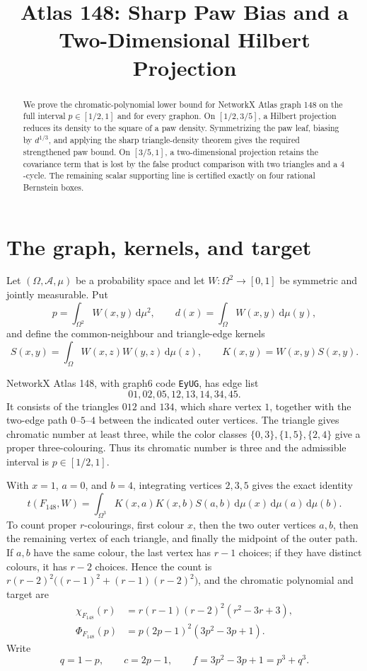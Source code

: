 \documentclass[11pt]{article}
\title{Atlas 148: Sharp Paw Bias and a Two-Dimensional Hilbert Projection}
\author{}
\date{}
\newcommand{\dd}{\,\mathrm d}
\begin{document}
\maketitle

\begin{abstract}
We prove the chromatic-polynomial lower bound for NetworkX Atlas graph 148
on the full interval $p\in[1/2,1]$ and for every graphon.  On
$[1/2,3/5]$, a Hilbert projection reduces its density to the square of a
paw density.  Symmetrizing the paw leaf, biasing by $d^{1/3}$, and applying
the sharp triangle-density theorem gives the required strengthened paw
bound.  On $[3/5,1]$, a two-dimensional projection retains the covariance
term that is lost by the false product comparison with two triangles and a
$4$-cycle.  The remaining scalar supporting line is certified exactly on
four rational Bernstein boxes.
\end{abstract}


\section{The graph, kernels, and target}

Let $(\Omega,\mathcal A,\mu)$ be a probability space and let
$W\colon\Omega^2\to[0,1]$ be symmetric and jointly measurable.  Put
\[
 p=\int_{\Omega^2}W(x,y)\dd\mu^2,
 \qquad
 d(x)=\int_\Omega W(x,y)\dd\mu(y),
\]
and define the common-neighbour and triangle-edge kernels
\[
 S(x,y)=\int_\Omega W(x,z)W(y,z)\dd\mu(z),
 \qquad K(x,y)=W(x,y)S(x,y).
\]

NetworkX Atlas 148, with graph6 code \texttt{EyUG}, has edge list
\[
 01,02,05,12,13,14,34,45.
\]
It consists of the triangles $012$ and $134$, which share vertex $1$,
together with the two-edge path $0$--$5$--$4$ between the indicated outer
vertices.  The triangle gives chromatic number at least three, while the
color classes $\{0,3\},\{1,5\},\{2,4\}$ give a proper three-colouring.
Thus its chromatic number is three and the admissible interval is
$p\in[1/2,1]$.

With $x=1$, $a=0$, and $b=4$, integrating vertices $2,3,5$ gives
the exact identity
\begin{equation}
 t(F_{148},W)
 =\int_{\Omega^3}K(x,a)K(x,b)S(a,b)\dd\mu(x)\dd\mu(a)\dd\mu(b).
 \label{eq:density-kernels}
\end{equation}
To count proper $r$-colourings, first colour $x$, then the two outer vertices
$a,b$, then the remaining vertex of each triangle, and finally the midpoint
of the outer path.  If $a,b$ have the same colour, the last vertex has
$r-1$ choices; if they have distinct colours, it has $r-2$ choices.  Hence
the count is
$r(r-2)^2\bigl((r-1)^2+(r-1)(r-2)^2\bigr)$, and the chromatic polynomial
and target are
\begin{align}
 \chi_{F_{148}}(r)
 &=r(r-1)(r-2)^2(r^2-3r+3),
 \label{eq:chromatic}\\
 \Phi_{F_{148}}(p)
 &=p(2p-1)^2(3p^2-3p+1).
 \label{eq:target}
\end{align}
Write
\[
 q=1-p,\qquad c=2p-1,\qquad f=3p^2-3p+1=p^3+q^3.
\]
\end{document}
